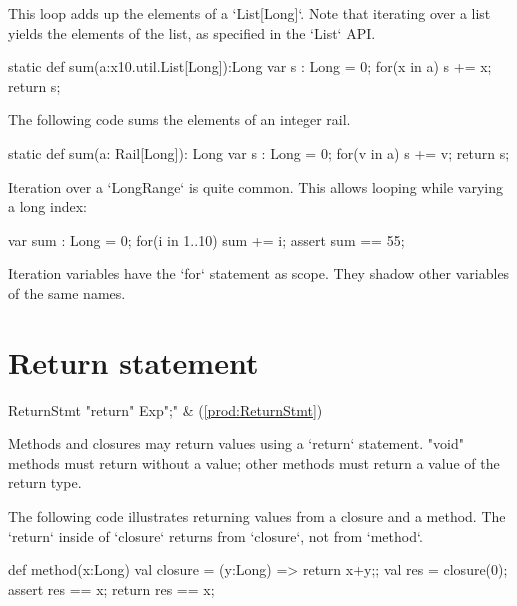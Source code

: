 \begin{ex}
This loop adds up the elements of a \xcd`List[Long]`.
Note that iterating over a list yields the elements of the list, as specified
in the \xcd`List` API. 
\begin{xten}
static def sum(a:x10.util.List[Long]):Long {
  var s : Long = 0;
  for(x in a) s += x;
  return s;
}
\end{xten}

The following code sums the elements of an integer rail. 
\begin{xten}
static def sum(a: Rail[Long]): Long {
  var s : Long = 0;
  for(v in a) s += v;
  return s;
}
\end{xten}

Iteration over a \xcd`LongRange` is quite common. This
allows looping while varying a long index: 
\begin{xten}
var sum : Long = 0;
for(i in 1..10) sum += i;
assert sum == 55;
\end{xten}


\end{ex}

Iteration variables have the \xcd`for` statement as scope.  They shadow other
variables of the same names.


\section{Return statement}
\label{ReturnStatement}

\begin{bbgrammar}
          ReturnStmt \: \xcd"return" Exp\opt \xcd";" & (\ref{prod:ReturnStmt}) \\
\end{bbgrammar}

Methods and closures may return values using a \xcd`return` statement. 
\xcd"void" methods must return without a value; other methods must return a value of the return type. 

\begin{ex}
The following code illustrates returning values from a closure and a method.
The \xcd`return` inside of \xcd`closure` returns from \xcd`closure`, not from
\xcd`method`.  
\begin{xten}
def method(x:Long) {
  val closure = (y:Long) => {return x+y;}; 
  val res = closure(0);
  assert res == x;
  return res == x;
}
\end{xten}


\end{ex}


